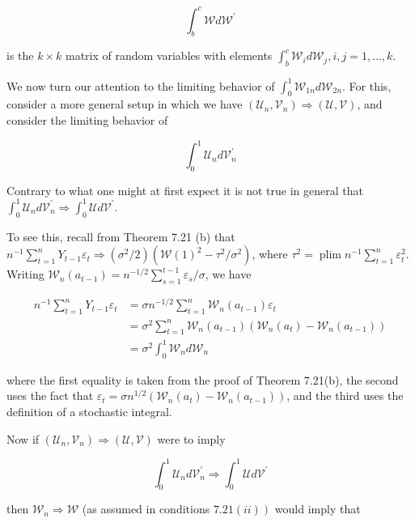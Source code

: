 \documentclass[10pt]{article}
\begin{document}
$$
\int_{b}^{c} \mathcal{W} d \mathcal{W}^{\prime}
$$

is the $k \times k$ matrix of random variables with elements $\int_{b}^{c} \mathcal{W}_{i} d \mathcal{W}_{j}, i, j= 1, \ldots, k$.

We now turn our attention to the limiting behavior of $\int_{0}^{1} \mathcal{W}_{1 n} d \mathcal{W}_{2 n}$. For this, consider a more general setup in which we have $\left(\mathcal{U}_{n}, \mathcal{V}_{n}\right) \Rightarrow(\mathcal{U}, \mathcal{V})$, and consider the limiting behavior of

$$
\int_{0}^{1} \mathcal{U}_{n} d \mathcal{V}_{n}^{\prime}
$$

Contrary to what one might at first expect it is not true in general that $\int_{0}^{1} \mathcal{U}_{n} d \mathcal{V}_{n}^{\prime} \Rightarrow \int_{0}^{1} \mathcal{U} d \mathcal{V}^{\prime}$.

To see this, recall from Theorem 7.21 (b) that $n^{-1} \sum_{t=1}^{n} Y_{t-1} \varepsilon_{t} \Rightarrow\left(\sigma^{2} / 2\right) \left(\mathcal{W}(1)^{2}-\tau^{2} / \sigma^{2}\right)$, where $\tau^{2}=\operatorname{plim} n^{-1} \sum_{t=1}^{n} \varepsilon_{t}^{2}$. Writing $\mathcal{W}_{n}\left(a_{t-1}\right)=n^{-1 / 2} \sum_{s=1}^{t-1} \varepsilon_{s} / \sigma$, we have

$$
\begin{aligned}
n^{-1} \sum_{t=1}^{n} Y_{t-1} \varepsilon_{t} & =\sigma n^{-1 / 2} \sum_{t=1}^{n} \mathcal{W}_{n}\left(a_{t-1}\right) \varepsilon_{t} \\
& =\sigma^{2} \sum_{t=1}^{n} \mathcal{W}_{n}\left(a_{t-1}\right)\left(\mathcal{W}_{n}\left(a_{t}\right)-\mathcal{W}_{n}\left(a_{t-1}\right)\right) \\
& =\sigma^{2} \int_{0}^{1} \mathcal{W}_{n} d \mathcal{W}_{n}
\end{aligned}
$$

where the first equality is taken from the proof of Theorem 7.21(b), the second uses the fact that $\varepsilon_{t}=\sigma n^{1 / 2}\left(\mathcal{W}_{n}\left(a_{t}\right)-\mathcal{W}_{n}\left(a_{t-1}\right)\right)$, and the third uses the definition of a stochastic integral.

Now if $\left(\mathcal{U}_{n}, \mathcal{V}_{n}\right) \Rightarrow(\mathcal{U}, \mathcal{V})$ were to imply

$$
\int_{0}^{1} \mathcal{U}_{n} d \mathcal{V}_{n}^{\prime} \Rightarrow \int_{0}^{1} \mathcal{U} d \mathcal{V}^{\prime}
$$

then $\mathcal{W}_{n} \Rightarrow \mathcal{W}$ (as assumed in conditions $\left.7.21(i i)\right)$ would imply that
\end{document}
